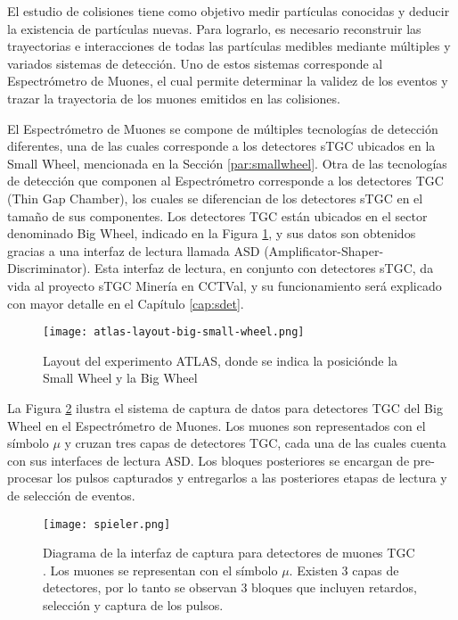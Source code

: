 	El estudio de colisiones tiene como objetivo medir partículas conocidas y deducir la existencia de partículas nuevas. Para lograrlo, es necesario reconstruir las trayectorias e interacciones de todas las partículas medibles mediante múltiples y variados sistemas de detección. Uno de estos sistemas corresponde al Espectrómetro de Muones\cite{Pontecorvo2004TheSpectrometer}, el cual permite determinar la validez de los eventos y trazar la trayectoria de los muones emitidos en las colisiones. 
	
	El Espectrómetro de Muones se compone de múltiples tecnologías de detección diferentes, una de las cuales corresponde a los detectores sTGC ubicados en la Small Wheel, mencionada en la Sección \ref{par:smallwheel}. Otra de las tecnologías de detección que componen al Espectrómetro corresponde a los detectores TGC (Thin Gap Chamber), los cuales se diferencian de los detectores sTGC en el tamaño de sus componentes. Los detectores TGC están ubicados en el sector denominado Big Wheel, indicado en la Figura \ref{fig:both-wheels}, y sus datos son obtenidos gracias a una interfaz de lectura llamada ASD (Amplificator-Shaper-Discriminator). Esta interfaz de lectura, en conjunto con detectores sTGC, da vida al proyecto sTGC Minería en CCTVal, y su funcionamiento será explicado con mayor detalle en el Capítulo \ref{cap:sdet}.
	
	\begin{figure}[h]
		\centering
		\texttt{[image: atlas-layout-big-small-wheel.png]} 
		\caption{Layout del experimento ATLAS, donde se indica la posiciónde la Small Wheel y la Big Wheel\cite{Formenti2018CERNReport}}
		\label{fig:both-wheels}
	\end{figure}
	
	La Figura \ref{fig:spieler} ilustra el sistema de captura de datos para detectores TGC del Big Wheel en el Espectrómetro de Muones. Los muones son representados con el símbolo $\mu$ y cruzan tres capas de detectores TGC, cada una de las cuales cuenta con sus interfaces de lectura ASD. Los bloques posteriores se encargan de pre-procesar los pulsos capturados y entregarlos a las posteriores etapas de lectura y de selección de eventos.
	
	\begin{figure}[h]
		\centering
		\texttt{[image: spieler.png]}
		\caption{Diagrama de la interfaz de captura para detectores de muones TGC \cite{Spieler2012ElectronicsAcquisition}. Los muones se representan con el símbolo $\mu$. Existen 3 capas de detectores, por lo tanto se observan 3 bloques que incluyen retardos, selección y captura de los pulsos.}
		\label{fig:spieler}
	\end{figure}

